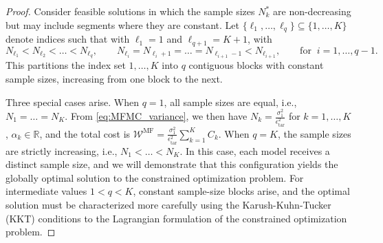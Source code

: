 \begin{proof}
Consider feasible solutions in which the sample sizes $N_k^*$ are non-decreasing but may include segments where they are constant. Let $\{\ell_1, \ldots, \ell_q\}\subseteq \{1,\ldots, K\}$ denote indices such that with $\ell_1=1$ and $\ell_{q+1} = K+1$, with
%
\[
N_{\ell_1}<N_{\ell_2}<\ldots < N_{\ell_{q}},\quad\quad  N_{\ell_i}=N_{\ell_i+1}=\ldots = N_{\ell_{i+1}-1} <N_{\ell_{i+1}}, \qquad \text{for}\;\;  i=1,\ldots,q-1.
\]
%
This partitions the index set ${1,\dots,K}$ into $q$ contiguous blocks with constant sample sizes, increasing from one block to the next. 

Three special cases arise. When $q=1$, all sample sizes are equal, i.e., $N_1=\ldots=N_K$. From \eqref{eq:MFMC_variance}, we then have $N_k=\frac{\sigma_1^2}{\epsilon_{\text{tar}}^2}$ for $k=1,\ldots, K$, $\alpha_k\in \mathbb{R}$, and the total cost is $\mathcal{W}^\text{MF} = \frac{\sigma_1^2}{\epsilon_{\text{tar}}^2} \sum_{k=1}^K C_k$. When $q=K$, the sample sizes are strictly increasing, i.e., $N_1<\ldots<N_K$. In this case, each model receives a distinct sample size, and we will demonstrate that this configuration yields the globally optimal solution to the constrained optimization problem. For intermediate values $1<q<K$, constant sample-size blocks arise, and the optimal solution must be characterized more carefully using the Karush-Kuhn-Tucker (KKT) conditions to the Lagrangian formulation of the constrained optimization problem.


\end{proof}
